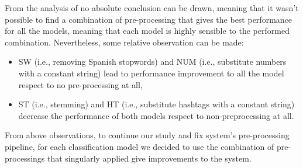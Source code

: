 From the analysis of  no absolute conclusion can be drawn, meaning that it wasn't possible to find a combination of pre-processing that gives the best performance for all the models, meaning that each model is highly sensible to the performed combination. Nevertheless, some relative observation can be made:
\begin{itemize}
\item SW (i.e., removing Spanish stopwords) and NUM (i.e., substitute numbers with a constant string) lead to performance improvement to all the model respect to no pre-processing at all,
\item ST (i.e., stemming) and HT (i.e., substitute hashtags with a constant string) decrease the performance of both models respect to non-preprocessing at all.
\end{itemize}

From above observations, to continue our study and fix system's pre-processing pipeline, for each classification model we decided to use the combination of pre-processings that singularly applied give improvements to the system.

